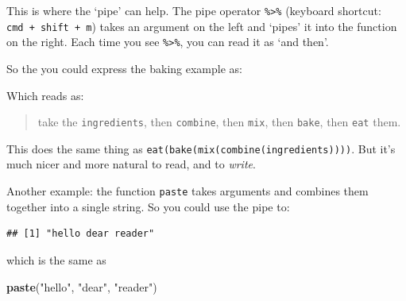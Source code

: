 \documentclass[]{book}
\newenvironment{Shaded}{\begin{snugshade}}{\end{snugshade}}
\newcommand{\CommentTok}[1]{\textcolor[rgb]{0.56,0.35,0.01}{\textit{#1}}}
\newcommand{\KeywordTok}[1]{\textcolor[rgb]{0.13,0.29,0.53}{\textbf{#1}}}
\newcommand{\NormalTok}[1]{#1}
\newcommand{\OperatorTok}[1]{\textcolor[rgb]{0.81,0.36,0.00}{\textbf{#1}}}
\newcommand{\StringTok}[1]{\textcolor[rgb]{0.31,0.60,0.02}{#1}}
\begin{document}
This is where the `pipe' can help. The pipe operator \texttt{\%\textgreater{}\%} (keyboard shortcut: \texttt{cmd\ +\ shift\ +\ m}) takes an argument on the left and `pipes' it into the function on the right. Each time you see \texttt{\%\textgreater{}\%}, you can read it as `and then'.

So the you could express the baking example as:

\begin{Shaded}
\end{Shaded}

Which reads as:

\begin{quote}
take the \texttt{ingredients}, then \texttt{combine}, then \texttt{mix}, then \texttt{bake}, then \texttt{eat} them.
\end{quote}

This does the same thing as \texttt{eat(bake(mix(combine(ingredients))))}. But it's much nicer and more natural to read, and to \emph{write}.

Another example: the function \texttt{paste} takes arguments and combines them together into a single string. So you could use the pipe to:

\begin{Shaded}
\end{Shaded}

\begin{verbatim}
## [1] "hello dear reader"
\end{verbatim}

which is the same as

\begin{Shaded}
\begin{Highlighting}[]
\KeywordTok{paste}\NormalTok{(}\StringTok{"hello"}\NormalTok{, }\StringTok{"dear"}\NormalTok{, }\StringTok{"reader"}\NormalTok{)}
\end{Highlighting}
\end{Shaded}
\end{document}

